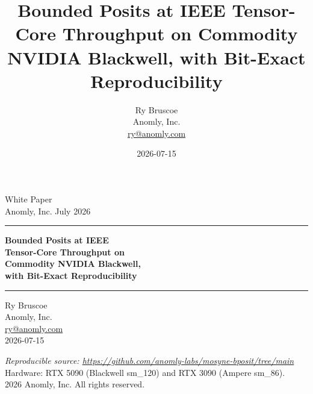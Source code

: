 \documentclass[11pt,a4paper]{article}
\title{Bounded Posits at IEEE Tensor-Core Throughput on Commodity NVIDIA Blackwell, with Bit-Exact Reproducibility}
\author{Ry Bruscoe\\Anomly, Inc.\\\href{mailto:ry@anomly.com}{ry@anomly.com}}
\date{2026-07-15}
\begin{document}
\begin{titlepage}
\centering
\vspace*{3.5cm}

{\large White Paper}\\[0.2cm]
{\small Anomly, Inc. \quad\textbullet\quad July 2026}

\vspace{2.0cm}

\rule{0.6\linewidth}{0.4pt}

\vspace{1.4cm}

{\LARGE\bfseries Bounded Posits at IEEE\\
Tensor-Core Throughput on\\
Commodity NVIDIA Blackwell,\\
with Bit-Exact Reproducibility\par}

\vspace{1.0cm}

\rule{0.6\linewidth}{0.4pt}

\vspace{2.6cm}

{\large Ry Bruscoe}\\[0.2cm]
{\small Anomly, Inc.}\\[0.2cm]
{\small \href{mailto:ry@anomly.com}{ry@anomly.com}}\\[0.2cm]
\vspace{0.3cm}
{\small 2026-07-15}

\vfill

{\small\itshape Reproducible source: \url{https://github.com/anomly-labs/mosyne-bposit/tree/main}}\\[0.3cm]
{\footnotesize Hardware: RTX 5090 (Blackwell sm\_120) and RTX 3090 (Ampere sm\_86).}\\[0.5cm]
{\footnotesize\textcopyright{} 2026 Anomly, Inc. All rights reserved.}

\end{titlepage}
\end{document}
